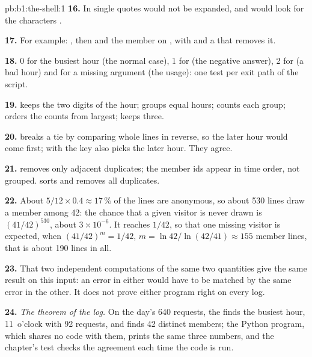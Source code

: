 \begin{solution}{pb:b1:the-shell:1}
\textbf{16.} In single quotes  would not be expanded, and  would look for the characters
.

\textbf{17.} For example: , then  and the member
 on , with  and a  that removes it.

\textbf{18.} 0 for the busiest hour (the normal case), 1 for  (the negative answer), 2 for  (a bad hour)
and for a missing argument (the usage): one test per exit path of the script.

\textbf{19.}  keeps the two digits of the hour;  groups equal hours;  counts each group;
 orders the counts from largest;  keeps three.

\textbf{20.}  breaks a tie by comparing whole lines in reverse, so the later hour would come first;
 with the key  also picks the later hour. They agree.

\textbf{21.}  removes only adjacent duplicates; the member ids appear in time order, not grouped. 
sorts and removes all duplicates.

\textbf{22.} About $5/12 \times 0.4 \approx 17\,\%$ of the lines are anonymous, so about 530 lines draw a member among 42:
the chance that a given visitor is never drawn is $(41/42)^{530}$, about $3 \times 10^{-6}$. It reaches $1/42$, so that
one missing visitor is expected, when $(41/42)^m = 1/42$, $m = \ln 42 / \ln(42/41) \approx 155$ member lines, that is
about 190 lines in all.

\textbf{23.} That two independent computations of the same two quantities give the same result on this input: an error
in either would have to be matched by the same error in the other. It does not prove either program right on every log.

\textbf{24.} \emph{The  theorem of the log.} On the day's 640 requests, the 
 finds the busiest hour, 11~o'clock with 92 requests, and
 finds 42 distinct members; the Python program, which shares no code with them, prints the same three
numbers, and the chapter's test checks the agreement each time the code is run.
\end{solution}

